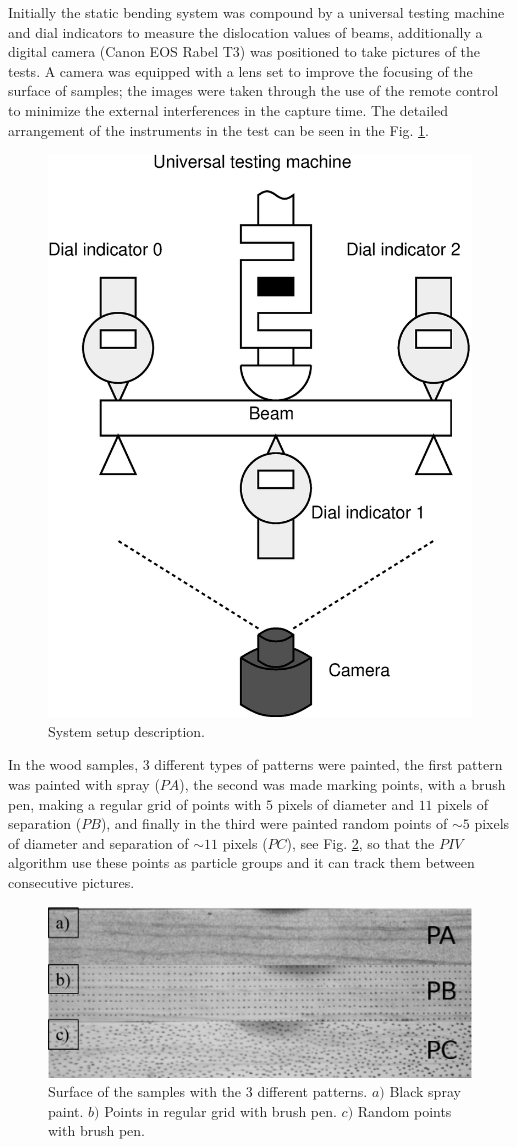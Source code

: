 Initially the static bending system was compound by a universal testing machine
and  dial indicators to measure the dislocation values of beams,
additionally a digital camera (Canon EOS Rabel T3) was positioned 
to take pictures of the tests. 
A camera was equipped with a lens set to improve
the focusing of the surface of samples; the images were taken through the use of
the remote control to minimize the external interferences in the capture time. 
The detailed arrangement of the instruments in the test can be seen in the Fig. \ref{fig:system1}.
\begin{figure}[H]
\centering
\includegraphics[width=0.45\columnwidth]{Diagrama1.eps}
\caption{System setup description.}
\label{fig:system1}
\end{figure}

In the wood samples, 3 different types of patterns were painted,
the first pattern was painted with spray ($PA$), the second was made marking points, 
with a brush pen, making a regular grid of points with 
$5$ pixels of diameter and $11$ pixels of separation ($PB$), 
and finally in the third were painted
random points of $\sim 5$ pixels of diameter and separation of $\sim 11$ 
pixels  ($PC$), see Fig. \ref{fig:samplesabc}, 
so that the $PIV$ algorithm use these points as particle groups and 
it can track them between consecutive pictures.
\begin{figure}[H]
\centering
\includegraphics[width=\columnwidth]{abc.eps}
\caption{Surface of the samples with the 3 different patterns. 
$a)$ Black spray paint. $b)$ Points in regular grid with brush pen. $c)$ Random points with brush pen.}
\label{fig:samplesabc}
\end{figure}

